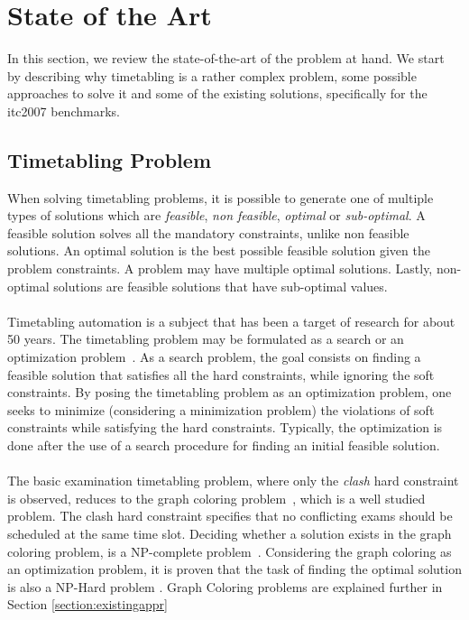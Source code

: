 \chapter{State of the Art}
\label{stateofart}
\thispagestyle{plain}

In this section, we review the state-of-the-art of the problem at hand. We start by describing why timetabling is a rather complex problem, some possible approaches to solve it and some of the existing solutions, specifically for the \gls{itc2007} benchmarks.\\

\section{Timetabling Problem}

When solving timetabling problems, it is possible to generate one of multiple types of solutions which are \textit{feasible}, \textit{non feasible}, \textit{optimal} or \textit{sub-optimal}. A feasible solution solves all the mandatory constraints, unlike non feasible solutions. An optimal solution is the best possible feasible solution given the problem constraints. A problem may have multiple optimal solutions. Lastly, non-optimal solutions are feasible solutions that have sub-optimal values.\\
\\
Timetabling automation is a subject that has been a target of research for about 50 years. The timetabling problem may be formulated as a search or an optimization problem~\cite{Schaerf1999}. As a search problem, the goal consists on finding a feasible solution that satisfies all the hard constraints, while ignoring the soft constraints. By posing the timetabling problem as an optimization problem, one seeks to minimize (considering a minimization problem) the violations of soft constraints while satisfying the hard constraints. Typically, the optimization is done after the use of a search procedure for finding an initial feasible solution.\\
\\
The basic examination timetabling problem, where only the \textit{clash} hard constraint is observed, reduces to the graph coloring problem~\cite{Jensen2001}, which is a well studied problem. The clash hard constraint specifies that no conflicting exams should be scheduled at the same time slot. Deciding whether a solution exists in the graph coloring problem, is a NP-complete problem~\cite{Arora2009}. Considering the graph coloring as an optimization problem, it is proven that the task of finding the optimal solution is also a NP-Hard problem \cite{Arora2009}. Graph Coloring problems are explained further in Section \ref{section:existingappr}
\\
